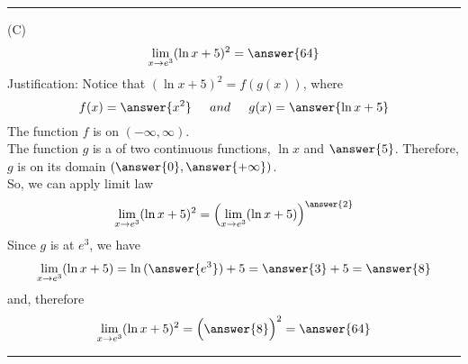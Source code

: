 \documentclass{ximera}
\begin{document}
\begin{exercise}
\noindent\rule[0.5ex]{\linewidth}{.2pt}
(C) 
 \[
\lim_{x\to e^{3}}(\ln{x}+5)^{2} = \answer{64}
\] 
Justification: Notice that $(\ln{x}+5)^{2} =f(g(x)) $, where
\[
 f(x)=\answer{x^{2}} \hspace{0.2in}and \hspace{0.2in} g(x)=\answer{\ln{x}+5}
\] 
The function $f$ is   on $ (-\infty,\infty)$.\\
The function $g$ is a   of two continuous functions, $\ln{x}$ and $ \answer{5}$.
Therefore, $g$ is   on its domain $(\answer{0},\answer{+\infty})$.\\
So, we can apply
  limit law 
 \[
\lim_{x\to e^{3}}(\ln{x}+5)^{2} =\Bigl(\lim_{x\to e^{3}}(\ln{x}+5)\Bigr)^{\answer{2}} 
\] 
Since $g$ is   at $e^{3}$, we have
 \[
\lim_{x\to e^{3}}(\ln{x}+5)=\ln{(\answer{e^{3}})}+5=\answer{3}+5=\answer{8}
\] 
and, therefore
\[
\lim_{x\to e^{3}}(\ln{x}+5)^{2} = \Bigl(\answer{8}\Bigr)^{2} =\answer{64}
\] 
\noindent\rule[0.5ex]{\linewidth}{.2pt}
\end{exercise}
\end{document}
